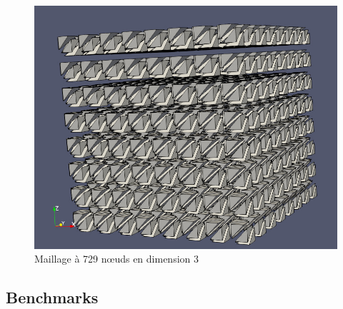 \begin{figure}[h]
\begin{center}
\includegraphics[scale=0.2]{images/CholeskyMaillageDim3-729.jpg}
\caption{Maillage à 729 n\oe uds en dimension 3}
\label{CholeskyMaillageDim3-729}  
\end{center}
\end{figure}


\subsection{Benchmarks}


